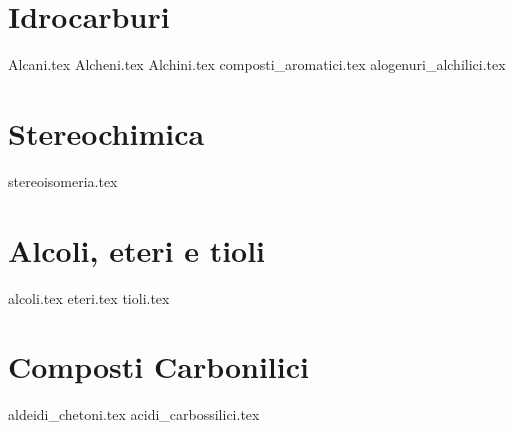 \documentclass[
    a4paper,
    12pt,
    oneside,
    ]{book} %
\begin{document}
\part{Idrocarburi}
{Alcani.tex} %
{Alcheni.tex} %
{Alchini.tex} %
{composti_aromatici.tex} %
{alogenuri_alchilici.tex} %


\part{Stereochimica}
{stereoisomeria.tex} %


\part{Alcoli, eteri e tioli}
{alcoli.tex} %
{eteri.tex} %
{tioli.tex} %
% 

\part{Composti Carbonilici}
{aldeidi_chetoni.tex} %
{acidi_carbossilici.tex} %
\end{document}
